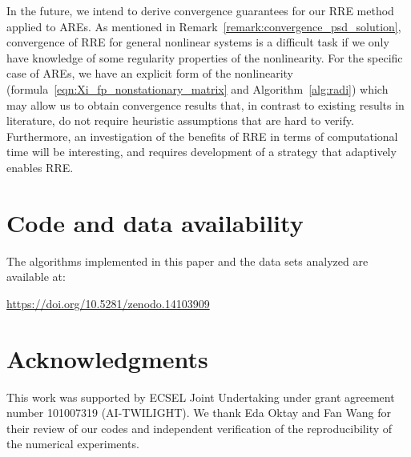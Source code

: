 In the future, we intend to derive convergence guarantees for our \ac{RRE} method applied to \acp{ARE}.
As mentioned in Remark~\ref{remark:convergence_psd_solution}, convergence of \ac{RRE} for general nonlinear systems is a difficult task if we only have knowledge of some regularity properties of the nonlinearity.
For the specific case of \acp{ARE}, we have an explicit form of the nonlinearity (formula~\eqref{eqn:Xi_fp_nonstationary_matrix} and Algorithm~\ref{alg:radi}) which may allow us to obtain convergence results that, in contrast to existing results in literature, do not require heuristic assumptions that are hard to verify.
Furthermore, an investigation of the benefits of \ac{RRE} in terms of computational time will be interesting, and requires development of a strategy that adaptively enables \ac{RRE}.

\section*{Code and data availability}

The algorithms implemented in this paper and the data sets analyzed are available at:

\begin{center}
	\url{https://doi.org/10.5281/zenodo.14103909}
\end{center}

\section*{Acknowledgments}

This work was supported by ECSEL Joint Undertaking under grant agreement number 101007319 (AI-TWILIGHT).
We thank
Eda Oktay and Fan Wang %
for their review of our codes and independent verification of the reproducibility of the numerical experiments.

